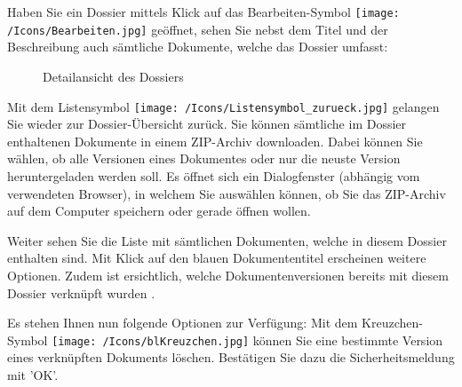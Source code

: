 \vspace{\baselineskip}

Haben Sie ein Dossier mittels Klick auf das Bearbeiten-Symbol \texttt{[image: /Icons/Bearbeiten.jpg]}  geöffnet, sehen Sie nebst dem Titel und der Beschreibung auch sämtliche Dokumente, welche das Dossier umfasst:

\begin{figure}[H]
\caption{Detailansicht des Dossiers}
\end{figure}

Mit dem Listensymbol \texttt{[image: /Icons/Listensymbol\_zurueck.jpg]}  gelangen Sie wieder zur Dossier-Übersicht zurück. Sie können sämtliche im Dossier enthaltenen Dokumente in einem ZIP-Archiv downloaden. Dabei können Sie wählen, ob alle Versionen eines Dokumentes oder nur die neuste Version heruntergeladen werden soll.  Es öffnet sich ein Dialogfenster (abhängig vom verwendeten Browser), in welchem Sie auswählen können, ob Sie das ZIP-Archiv auf dem Computer speichern oder gerade öffnen wollen. \newline

Weiter sehen Sie die Liste mit sämtlichen Dokumenten, welche in diesem Dossier enthalten sind. Mit Klick auf den blauen Dokumententitel  erscheinen weitere Optionen. Zudem ist ersichtlich, welche Dokumentenversionen bereits mit diesem Dossier verknüpft wurden . \newline

Es stehen Ihnen nun folgende Optionen zur Verfügung:
Mit dem Kreuzchen-Symbol \texttt{[image: /Icons/blKreuzchen.jpg]}  können Sie eine bestimmte Version eines verknüpften Dokuments löschen. Bestätigen Sie dazu die Sicherheitsmeldung mit 'OK'.

\begin{figure}[H]
\end{figure}

